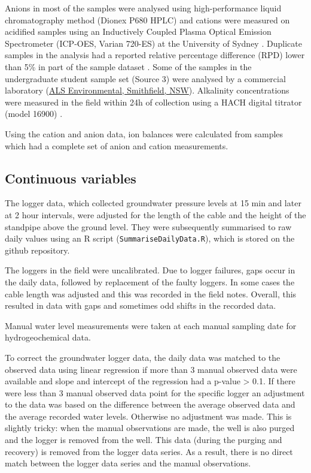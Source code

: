 \documentclass[, manuscript]{copernicus}
\begin{document}
Anions in most of the samples were analysed using high-performance
liquid chromatography method (Dionex P680 HPLC) and cations were
measured on acidified samples using an Inductively Coupled Plasma
Optical Emission Spectrometer (ICP-OES, Varian 720-ES) at the University
of Sydney \citep{Akter2018}. Duplicate samples in the analysis had a
reported relative percentage difference (RPD) lower than 5\% in part of
the sample dataset \citep{Akter2018}. Some of the samples in the
undergraduate student sample set (Source 3) were analysed by a
commercial laboratory
(\href{https://www.alsglobal.com/en/locations/asia-pacific/pacific/australia/nsw/sydney-woodpark-environmental}{ALS
Environmental, Smithfield, NSW}). Alkalinity concentrations were
measured in the field within 24h of collection using a HACH digital
titrator (model 16900) \citep{Akter2018}.

Using the cation and anion data, ion balances were calculated from
samples which had a complete set of anion and cation measurements.

\subsection{Continuous variables}

The logger data, which collected groundwater pressure levels at 15 min
and later at 2 hour intervals, were adjusted for the length of the cable
and the height of the standpipe above the ground level. They were
subsequently summarised to raw daily values using an R script
(\texttt{SummariseDailyData.R}), which is stored on the github
repository.

The loggers in the field were uncalibrated. Due to logger failures, gaps
occur in the daily data, followed by replacement of the faulty loggers.
In some cases the cable length was adjusted and this was recorded in the
field notes. Overall, this resulted in data with gaps and sometimes odd
shifts in the recorded data.

Manual water level measurements were taken at each manual sampling date
for hydrogeochemical data.

To correct the groundwater logger data, the daily data was matched to
the observed data using linear regression if more than 3 manual observed
data were available and slope and intercept of the regression had a
p-value \textgreater{} 0.1. If there were less than 3 manual observed
data point for the specific logger an adjustment to the data was based
on the difference between the average observed data and the average
recorded water levels. Otherwise no adjustment was made. This is
slightly tricky: when the manual observations are made, the well is also
purged and the logger is removed from the well. This data (during the
purging and recovery) is removed from the logger data series. As a
result, there is no direct match between the logger data series and the
manual observations.
\end{document}
